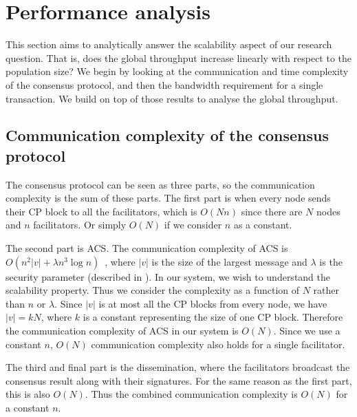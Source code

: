 \section{Performance analysis}
\label{sec:performance-analysis}
This section aims to analytically answer the scalability aspect of our research question.
That is, does the global throughput increase linearly with respect to the population size?
We begin by looking at the communication and time complexity of the consensus protocol,
and then the bandwidth requirement for a single transaction.
We build on top of those results to analyse the global throughput.

\subsection{Communication complexity of the consensus protocol}
\label{sec:cons-complexity}
The consensus protocol can be seen as three parts,
so the communication complexity is the sum of these parts.
The first part is when every node sends their CP block to all the facilitators, which is $O(Nn)$ since there are $N$ nodes and $n$ facilitators.
Or simply $O(N)$ if we consider $n$ as a constant.

The second part is ACS.
The communication complexity of ACS is $O(n^2|v| + \lambda n^3 \log n)$~\cite{miller2016honey},
where $|v|$ is the size of the largest message and $\lambda$ is the security parameter (described in ).
In our system, we wish to understand the scalability property.
Thus we consider the complexity as a function of $N$ rather than $n$ or $\lambda$.
Since $|v|$ is at most all the CP blocks from every node, we have $|v| = kN$,
where $k$ is a constant representing the size of one CP block.
Therefore the communication complexity of ACS in our system is $O(N)$.
Since we use a constant $n$, $O(N)$ communication complexity also holds for a single facilitator.

The third and final part is the dissemination, where the facilitators broadcast the consensus result along with their signatures.
For the same reason as the first part, this is also $O(N)$.
Thus the combined communication complexity is $O(N)$ for a constant $n$.


